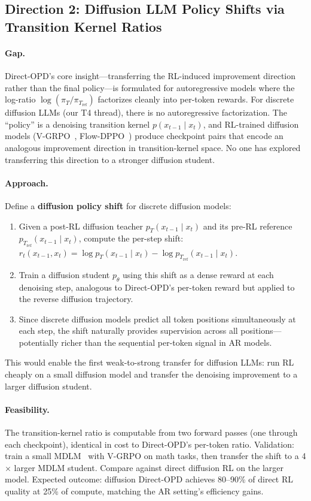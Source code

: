 \documentclass[11pt,a4paper]{article}
\begin{document}
\subsection{Direction 2: Diffusion LLM Policy Shifts via Transition Kernel Ratios}

\paragraph{Gap.} Direct-OPD's core insight---transferring the RL-induced improvement direction rather than the final policy---is formulated for autoregressive models where the log-ratio $\log(\pi_T / \pi_{T_\mathrm{ref}})$ factorizes cleanly into per-token rewards. For discrete diffusion LLMs (our T4 thread), there is no autoregressive factorization. The ``policy'' is a denoising transition kernel $p(x_{t-1} \mid x_t)$, and RL-trained diffusion models (V-GRPO~\cite{vgrpo2026}, Flow-DPPO~\cite{flowdppo2026}) produce checkpoint pairs that encode an analogous improvement direction in transition-kernel space. No one has explored transferring this direction to a stronger diffusion student.

\paragraph{Approach.} Define a \textbf{diffusion policy shift} for discrete diffusion models:
\begin{enumerate}
\item Given a post-RL diffusion teacher $p_T(x_{t-1} \mid x_t)$ and its pre-RL reference $p_{T_\mathrm{ref}}(x_{t-1} \mid x_t)$, compute the per-step shift: $r_t(x_{t-1}, x_t) = \log p_T(x_{t-1} \mid x_t) - \log p_{T_\mathrm{ref}}(x_{t-1} \mid x_t)$.
\item Train a diffusion student $p_\theta$ using this shift as a dense reward at each denoising step, analogous to Direct-OPD's per-token reward but applied to the reverse diffusion trajectory.
\item Since discrete diffusion models predict all token positions simultaneously at each step, the shift naturally provides supervision across all positions---potentially richer than the sequential per-token signal in AR models.
\end{enumerate}
This would enable the first weak-to-strong transfer for diffusion LLMs: run RL cheaply on a small diffusion model and transfer the denoising improvement to a larger diffusion student.

\paragraph{Feasibility.} The transition-kernel ratio is computable from two forward passes (one through each checkpoint), identical in cost to Direct-OPD's per-token ratio. Validation: train a small MDLM~\cite{sumi2026} with V-GRPO on math tasks, then transfer the shift to a 4$\times$ larger MDLM student. Compare against direct diffusion RL on the larger model. Expected outcome: diffusion Direct-OPD achieves 80--90\% of direct RL quality at 25\% of compute, matching the AR setting's efficiency gains.
\end{document}

